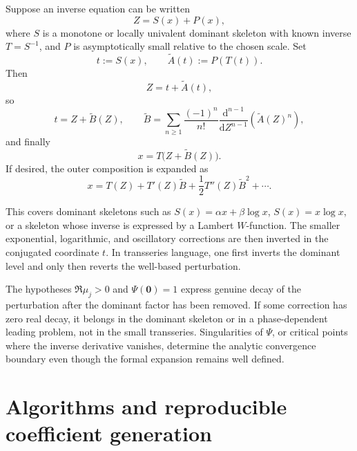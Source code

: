 \documentclass[11pt,oneside]{article}
\numberwithin{equation}{section}
\newcommand{\dd}{\mathrm{d}}
\newcommand{\vct}[1]{\boldsymbol{#1}}
\begin{document}
Suppose an inverse equation can be written
\begin{equation}
  Z=S(x)+P(x),
  \label{eq:skeleton-equation}
\end{equation}
where \(S\) is a monotone or locally univalent dominant skeleton with known
inverse \(T=S^{-1}\), and \(P\) is asymptotically small relative to the chosen
scale.  Set
\begin{equation}
  t:=S(x),
  \qquad
  \widetilde A(t):=P(T(t)).
  \label{eq:skeleton-conjugation}
\end{equation}
Then
\begin{equation}
  Z=t+\widetilde A(t),
\end{equation}
so
\begin{equation}
  t=Z+\widetilde B(Z),
  \qquad
  \widetilde B
  =\sum_{n\ge1}\frac{(-1)^n}{n!}
  \frac{\dd^{n-1}}{\dd Z^{n-1}}\left(\widetilde A(Z)^n\right),
  \label{eq:skeleton-B}
\end{equation}
and finally
\begin{equation}
  \boxed{x=T\bigl(Z+\widetilde B(Z)\bigr).}
  \label{eq:skeleton-final}
\end{equation}
If desired, the outer composition is expanded as
\begin{equation}
  x=T(Z)+T'(Z)\widetilde B
  +\frac12T''(Z)\widetilde B^2+\cdots.
  \label{eq:skeleton-outer-expansion}
\end{equation}

This covers dominant skeletons such as
\(S(x)=\alpha x+\beta\log x\), \(S(x)=x\log x\), or a skeleton whose inverse is
expressed by a Lambert \(W\)-function.  The smaller exponential, logarithmic,
and oscillatory corrections are then inverted in the conjugated coordinate
\(t\).  In transseries language, one first inverts the dominant level and only
then reverts the well-based perturbation.

\begin{warningbox}
The hypotheses \(\Re\mu_j>0\) and \(\Psi(\vct0)=1\) express genuine decay of
the perturbation after the dominant factor has been removed.  If some
correction has zero real decay, it belongs in the dominant skeleton or in a
phase-dependent leading problem, not in the small transseries.  Singularities
of \(\Psi\), or critical points where the inverse derivative vanishes, determine
the analytic convergence boundary even though the formal expansion remains
well defined.
\end{warningbox}

\section{Algorithms and reproducible coefficient generation}
\label{sec:algorithms}
\end{document}
